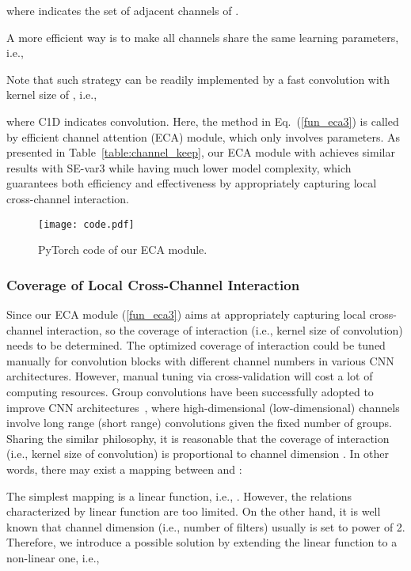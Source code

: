 \documentclass[10pt,twocolumn,letterpaper]{article}
\begin{document}
where  indicates the set of  adjacent channels of . 

A more efficient way is to make all channels share the same learning parameters, i.e.,

Note that such strategy can be readily implemented by a fast  convolution with kernel size of , i.e.,

where C1D indicates  convolution. Here, the method in Eq.~(\ref{fun_eca3}) is called by efficient channel attention (ECA) module, which only involves  parameters. As presented in Table~\ref{table:channel_keep}, our ECA module with  achieves similar results with SE-var3 while having much lower model complexity, which guarantees both efficiency and effectiveness by appropriately capturing local cross-channel interaction.

\begin{figure}[t]
	\centering
	\texttt{[image: code.pdf]}
	\caption{PyTorch code of our ECA module.}
	\label{fig:code}
\end{figure}

\subsubsection{Coverage of Local Cross-Channel Interaction}
Since our ECA module (\ref{fun_eca3}) aims at appropriately capturing local cross-channel interaction, so the coverage of interaction (i.e., kernel size  of  convolution) needs to be determined. The optimized coverage of interaction  could be tuned manually for convolution blocks with different channel numbers in various CNN architectures. However, manual tuning via cross-validation will cost a lot of computing resources. Group convolutions have been successfully adopted to improve CNN architectures~\cite{Zhang_2017_ICCV,XieGDTH17,Ioannou_2017_CVPR}, where high-dimensional (low-dimensional) channels involve long range (short range) convolutions given the fixed number of groups. Sharing the similar philosophy, it is reasonable that the coverage of interaction (i.e., kernel size  of  convolution) is proportional to channel dimension . In other words, there may exist a mapping  between  and : 
	
The simplest mapping is a linear function, i.e., . However, the relations characterized by linear function are too limited. On the other hand, it is well known that channel dimension  (i.e., number of filters) usually is set to power of 2. Therefore, we introduce a possible solution by extending the  linear function  to a non-linear one, i.e.,
	   
\end{document}
